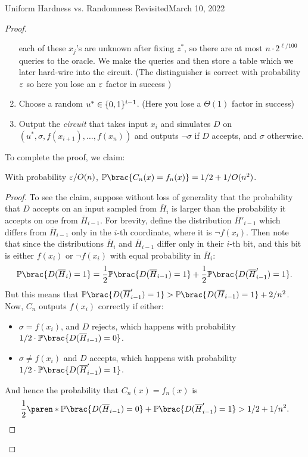 \begin{lecture}{8}{Uniform Hardness vs. Randomness Revisited}{March 10, 2022}
\begin{proof}
\begin{enumerate}
		each of these $x_j$'s are unknown after fixing $z^*$, so there
		are at most $n \cdot 2^{\ell / 100}$ queries to the oracle. We make the queries and then store a table which we later hard-wire into the circuit. (The distinguisher is correct with probability $\varepsilon$ so here you lose an $\varepsilon$ factor in success )
		\item Choose a random $u^* \in \{0, 1\}^{i - 1}$. (Here you lose a $\Theta(1)$ factor in success)
		\item Output the \emph{circuit} that takes input $x_i$ and simulates
		$D$ on $(u^*, \sigma, f(x_{i + 1}), \ldots , f(x_n))$ and outputs
		$\lnot \sigma$ if $D$ accepts, and $\sigma$ otherwise. 
	\end{enumerate}
	To complete the proof, we claim:
	
	\begin{claim}
		With probability $\varepsilon / O(n)$, $\Pr\brac{C_n(x) = f_n(x)} = 1/2 + 1/O(n^2)$.
	\end{claim}
	\begin{proof}
	To see the claim, suppose without loss of generality that the probability
	that $D$ accepts on an input sampled from $\overline{H}_{i}$ is larger
	than the probability it accepts on one from $\overline{H}_{i - 1}$.
	For brevity, define the distribution $\overline{H}'_{i - 1}$ which differs
	from $\overline{H}_{i - 1}$ only in the $i$-th coordinate, where it is
	$\lnot f(x_i)$.
	Then note that since the distributions $\overline{H}_i$ and
	$\overline{H}_{i - 1}$ differ only in their $i$-th bit, and this bit is
	either $f(x_i)$ or $\lnot f(x_i)$ with equal probability in
	$\overline{H}_i$:
	\[
	\Pr\brac{D(\overline{H}_{i}) = 1}
	= \frac 12 \Pr\brac{D(\overline{H}_{i - 1}) = 1}
	+ \frac 12 \Pr\brac{D(\overline{H}'_{i - 1}) = 1}.
	\]
	But this means that $\Pr\brac{D(\overline{H}'_{i - 1}) = 1} >
	\Pr\brac{D(\overline{H}_{i - 1}) = 1} + 2/n^2$.
	Now, $C_n$ outputs $f(x_i)$ correctly if either:
	\begin{itemize}
		\item $\sigma = f(x_i)$, and $D$ rejects, which happens with
		probability $1/2 \cdot \Pr\brac{D(\overline{H}_{i - 1}) = 0}$.
		\item $\sigma \neq f(x_i)$ and $D$ accepts, which happens with
		probability $1/2 \cdot \Pr\brac{D(\overline{H}'_{i - 1}) = 1}$.
	\end{itemize}
	And hence the probability that $C_n(x) = f_n(x)$ is
	\[
	\frac 12 \paren*{
		\Pr\brac{D(\overline{H}_{i - 1}) = 0} +
		\Pr\brac{D(\overline{H}'_{i - 1}) = 1}
	}
	> 1/2 + 1/n^2. \qedhere
	\]
	\end{proof}
	

\end{proof}
\end{lecture}
